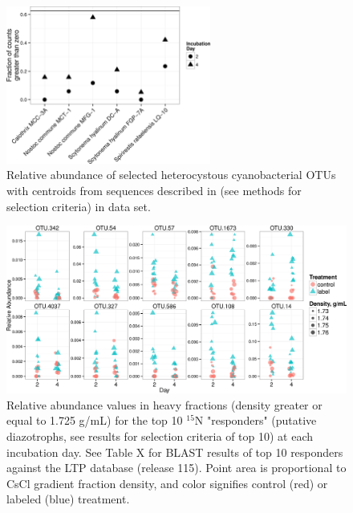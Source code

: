 \begin{figure}[h!]
  \centering
    \includegraphics[width=0.6\textwidth]{figures/het_sparsity/het_sparsity.png}
  \caption{Relative abundance of selected heterocystous cyanobacterial OTUs with centroids from sequences described in \citet{Yeager} (see methods for selection criteria) in \citet{Steven_2013} data set.}
  \label{fig:het_sparsity}
\end{figure}

\begin{figure}[h!]
  \centering
    \includegraphics[width=1.0\textwidth]{figures/scatter_heavy_topN2/scatter_heavy_topN.png}
  \caption{Relative abundance values in heavy fractions (density greater or equal to 1.725 g/mL) for the top 10 $^{15}$N "responders" (putative diazotrophs, see results for selection criteria of top 10) at each incubation day. See Table X for BLAST results of top 10 responders against the LTP database (release 115). Point area is proportional to CsCl gradient fraction density, and color signifies control (red) or labeled (blue) treatment.}
  \label{fig:scatter_heavy}
\end{figure}


